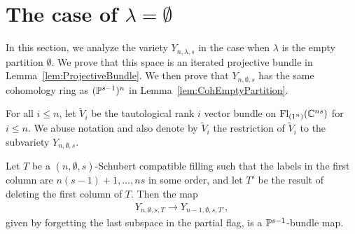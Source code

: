 \documentclass[12pt]{amsart}
\newcommand{\Fl}{\mathrm{Fl}}
\newcommand{\la}{\lambda}
\begin{document}
%
%





\section{The case of $\lambda = \emptyset$}\label{sec:EmptyPartition}

In this section, we analyze the variety $Y_{n,\lambda,s}$ in the case when $\lambda$ is the empty partition $\emptyset$. We prove that this space is an iterated projective bundle in Lemma~\ref{lem:ProjectiveBundle}. We then prove that $Y_{n,\emptyset,s}$ has the same cohomology ring as $(\mathbb{P}^{s-1})^n$ in Lemma~\ref{lem:CohEmptyPartition}.

For all $i\leq n$, let $\widetilde V_i$ be the tautological rank $i$ vector bundle on $\Fl_{(1^n)}(\bC^{ns})$ for $i\leq n$. We abuse notation and also denote by $\widetilde V_i$ the restriction of $\widetilde V_i$ to the subvariety $Y_{n,\emptyset,s}$. 

\begin{lemma}\label{lem:ProjectiveBundle}
Let $T$ be a $(n,\emptyset,s)$-Schubert compatible filling such that the labels in the first column are $n(s-1)+1,\dots, ns$ in some order, and let $T'$ be the result of deleting the first column of $T$. Then the map
\begin{align}\label{eq:ForgettingMap}
Y_{n,\emptyset,s,T} \rightarrow Y_{n-1,\emptyset,s,T'},
\end{align}
given by forgetting the last subspace in the partial flag, is a $\mathbb{P}^{s-1}$-bundle map.
\end{lemma}
\end{document}
